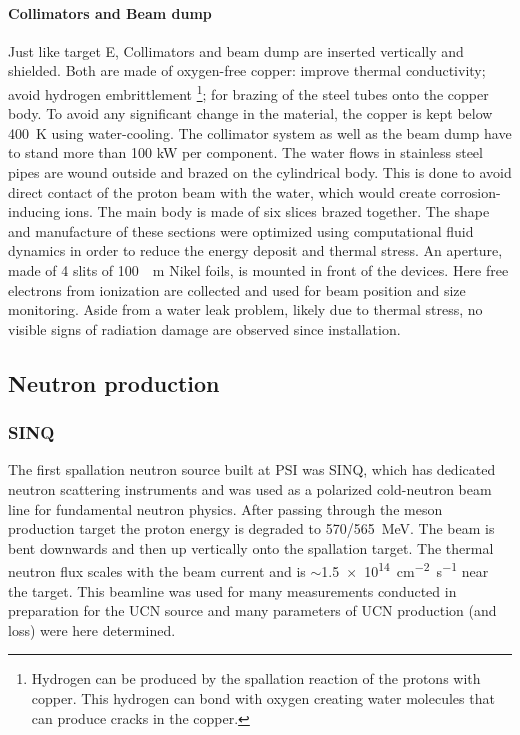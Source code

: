\begin{refsection}
        \paragraph{Collimators and Beam dump}
        Just like target E, Collimators and beam dump are inserted vertically and shielded.
        Both are made of oxygen-free copper: improve thermal conductivity; avoid hydrogen embrittlement \footnote{Hydrogen can be produced by the spallation reaction of the protons with copper. This hydrogen can bond with oxygen creating water molecules that can produce cracks in the copper.}; for brazing of the steel tubes onto the copper body.
        To avoid any significant change in the material, the copper is kept below \SI{400}{K} using water-cooling.
        The collimator system as well as the beam dump have to stand more than 100 kW per component.
        The water flows in stainless steel pipes are wound outside and brazed on the cylindrical body. 
        This is done to avoid direct contact of the proton beam with the water, which would create corrosion-inducing ions.
        The main body is made of six slices brazed together.
        The shape and manufacture of these sections were optimized using computational fluid dynamics in order to reduce the energy deposit and thermal stress.
        An aperture, made of 4 slits of \SI{100}{\mu m} Nikel foils, is mounted in front of the devices.
        Here free electrons from ionization are collected and used for beam position and size monitoring.
        Aside from a water leak problem, likely due to thermal stress, no visible signs of radiation damage are observed since installation.
        
    \subsection{Neutron production}
        \subsubsection{SINQ}
            The first spallation neutron source built at PSI was SINQ, which has dedicated neutron scattering instruments and was used as a polarized cold-neutron beam line for fundamental neutron physics.
            After passing through the meson production target the proton energy is degraded to \SI{570/565}{MeV}. 
            The beam is bent downwards and then up vertically onto the spallation target.
            The thermal neutron flux scales with the beam current and is $\sim$\SI{1.5e14}{cm^{-2}s^{-1}} near the target.
            This beamline was used for many measurements conducted in preparation for the UCN source and many parameters of UCN production (and loss) were here determined.
            

\end{refsection}
